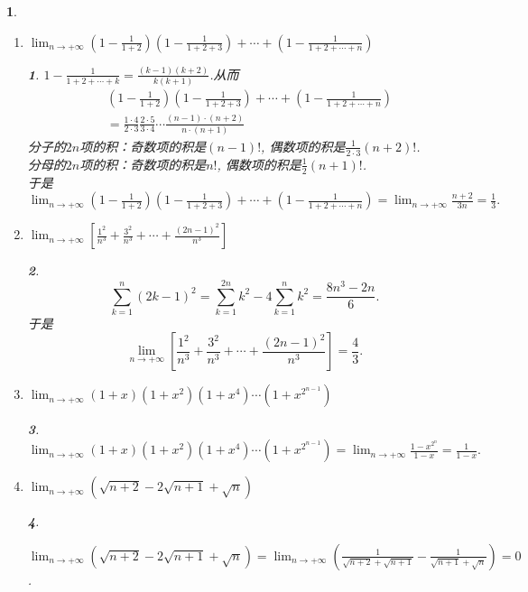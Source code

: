 \documentclass[utf8]{book}
\newtheorem{example}{}[section]             %
\newtheorem{solution}{}
\begin{document}
\begin{example}
\begin{enumerate}
\item $\displaystyle \lim_{n\to +\infty}\left(1-\frac{1}{1+2}\right)\left(1-\frac{1}{1+2+3}\right)+\cdots+\left(1-\frac{1}{1+2+\cdots+n}\right)$
\begin{solution}
$\displaystyle 1-\frac{1}{1+2+\cdots+k} = \frac{(k-1)(k+2)}{k(k+1)}$.从而
\begin{equation*}
\begin{split}
&\left(1-\frac{1}{1+2}\right)\left(1-\frac{1}{1+2+3}\right)+\cdots+\left(1-\frac{1}{1+2+\cdots+n}\right) \\
&=\frac{1\cdot 4}{2\cdot 3}\frac{2 \cdot 5}{3\cdot 4}\cdots \frac{(n-1)\cdot (n+2)}{n\cdot (n+1)}
\end{split}
\end{equation*}
分子的$2n$项的积：奇数项的积是$(n-1)!$, 偶数项的积是$\frac{1}{2\cdot 3}(n+2)!$.\\
分母的$2n$项的积：奇数项的积是$n!$, 偶数项的积是$\frac{1}{2}(n+1)!$.\\
于是$\displaystyle \lim_{n\to +\infty}\left(1-\frac{1}{1+2}\right)\left(1-\frac{1}{1+2+3}\right)+\cdots+\left(1-\frac{1}{1+2+\cdots+n}\right) = 
\lim_{n\to +\infty}\frac{n+2}{3n} = \frac{1}{3}.$
\end{solution}

\item $\displaystyle \lim_{n\to +\infty}\left[\frac{1^2}{n^3}+\frac{3^2}{n^3}+\cdots+\frac{(2n-1)^2}{n^3}\right]$
\begin{solution}
$$\sum_{k=1}^{n}(2k-1)^2 =\sum_{k=1}^{2n}k^2 - 4\sum_{k=1}^{n}k^2= \frac{8n^3 - 2n}{6}.$$
于是$$\displaystyle \lim_{n\to +\infty}\left[\frac{1^2}{n^3}+\frac{3^2}{n^3}+\cdots+\frac{(2n-1)^2}{n^3}\right] = \frac{4}{3}.$$
\end{solution}

\item $\displaystyle \lim_{n\to +\infty}(1+x)(1+x^2)(1+x^4)\cdots(1+x^{2^{n - 1}})$
\begin{solution}
$\displaystyle \lim_{n\to +\infty}(1+x)(1+x^2)(1+x^4)\cdots(1+x^{2^{n - 1}}) = \displaystyle \lim_{n\to +\infty}\frac{1-x^{2^n}}{1-x}=\frac{1}{1-x}.$
\end{solution}

\item $\displaystyle \lim_{n\to +\infty}(\sqrt{n+2}-2\sqrt{n+1}+\sqrt{n})$
\begin{solution}

\end{solution}
$\displaystyle \lim_{n\to +\infty}(\sqrt{n+2}-2\sqrt{n+1}+\sqrt{n})=
\lim_{n\to +\infty}\left(\frac{1}{\sqrt{n+2}+\sqrt{n+1}}-\frac{1}{\sqrt{n+1}+\sqrt{n}}\right)=0$.
\end{enumerate}
\endgroup
\end{example}
\end{document}
